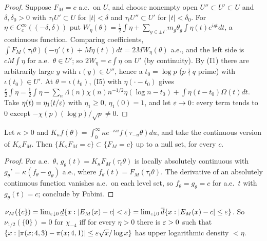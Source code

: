 \begin{proof}
Suppose $F_M=c$ a.e.\ on $U$, and choose nonempty open $U''\subset U'\subset U$ and $\delta,\delta_0>0$ with $\tau_tU'\subset U$ for $|t|<\delta$ and $\tau_tU''\subset U'$ for $|t|<\delta_0$. For $\eta\in C_c^\infty((-\delta,\delta))$ put $W_\eta(\theta)=\frac12\int\eta+\sum_{g\in\pm\Gamma}m_g\theta_g\int\eta(t)e^{igt}dt$, a continuous function. Comparing coefficients, $\int F_M(\tau_t\theta)(-\eta'(t)+M\eta(t))dt=2MW_\eta(\theta)$ a.e., and the left side is $cM\int\eta$ for a.e.\ $\theta\in U'$; so $2W_\eta=c\int\eta$ on $U'$ (by continuity). By (I1) there are arbitrarily large $y$ with $\iota(y)\in U''$, hence a $t_0=\log p$ ($p\nmid q$ prime) with $\iota(t_0)\in U'$. At $\theta=\iota(t_0)$, (I5) with $\eta(\cdot-t_0)$ gives $\frac c2\int\eta=\frac12\int\eta-\sum_n\Lambda(n)\chi(n)n^{-1/2}\eta(\log n-t_0)+\int\eta(t-t_0)\Omega(t)dt$. Take $\eta(t)=\eta_1(t/\varepsilon)$ with $\eta_1\ge0$, $\eta_1(0)=1$, and let $\varepsilon\to0$: every term tends to $0$ except $-\chi(p)(\log p)/\sqrt p\ne0$.
\end{proof}

\begin{proposition}\label{prop:finiteorder}
Let $\kappa>0$ and $K_\kappa f(\theta)=\int_0^\infty\kappa e^{-\kappa u}f(\tau_{-u}\theta)du$, and take the continuous version of $K_\kappa F_M$. Then $\{K_\kappa F_M=c\}\subset\{F_M=c\}$ up to a null set, for every $c$.
\end{proposition}

\begin{proof}
For a.e.\ $\theta$, $g_\theta(t)=K_\kappa F_M(\tau_t\theta)$ is locally absolutely continuous with $g_\theta'=\kappa(f_\theta-g_\theta)$ a.e., where $f_\theta(t)=F_M(\tau_t\theta)$. The derivative of an absolutely continuous function vanishes a.e.\ on each level set, so $f_\theta=g_\theta=c$ for a.e.\ $t$ with $g_\theta(t)=c$; conclude by Fubini.
\end{proof}

\begin{proposition}\label{prop:band}
$\nu_M(\{c\})=\lim_{\varepsilon\downarrow0}\underline d\{x:|E_M(x)-c|<\varepsilon\}=\lim_{\varepsilon\downarrow0}\overline d\{x:|E_M(x)-c|\le\varepsilon\}$. So $\nu_{1/2}(\{0\})=0$ for $\chi_{-4}$ iff for every $\eta>0$ there is $\varepsilon>0$ such that $\{x:|\pi(x;4,3)-\pi(x;4,1)|\le\varepsilon\sqrt x/\log x\}$ has upper logarithmic density $<\eta$.
\end{proposition}

